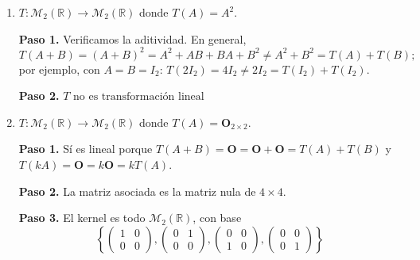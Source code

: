 \begin{prob}
\begin{enumerate}[$a)$]
\begin{myproof}
\textbf{Paso 4.} El rango de $A$ es $3$ (las filas son linealmente independientes) y los pivotes están en las columnas 1, 2 y 4, que forman una base para la imagen:
\[
\left\{
\begin{pmatrix}1\\0\\0\end{pmatrix},
\begin{pmatrix}1\\1\\0\end{pmatrix},
\begin{pmatrix}0\\1\\1\end{pmatrix}
\right\}
\]
$\boxed{\operatorname{rang}(T)=3,\ \operatorname{nul}(T)=2}$
\end{myproof}

\item $T:\mathcal{M}_{2}\left(\mathbb{R}\right) \rightarrow \mathcal{M}_{2}\left(\mathbb{R}\right)$ donde $
T(A)= A^{2}.$
\begin{myproof}
\textbf{Paso 1.} Verificamos la aditividad. En general,
\[
T(A+B) = (A+B)^2 = A^2 + AB + BA + B^2 \neq A^2 + B^2 = T(A) + T(B);
\]
por ejemplo, con $A = B = I_2$: $T(2I_2) = 4I_2 \neq 2I_2 = T(I_2) + T(I_2)$.

\textbf{Paso 2.} $\boxed{T \text{ no es transformación lineal}}$
\end{myproof}

\item $T:\mathcal{M}_{2}\left(\mathbb{R}\right) \rightarrow \mathcal{M}_{2}\left(\mathbb{R}\right)$ donde $T(A)=\mathbf{O}_{2\times 2}.$
\begin{myproof}
\textbf{Paso 1.} Sí es lineal porque $T(A+B) = \mathbf{O} = \mathbf{O} + \mathbf{O} = T(A) + T(B)$ y $T(kA) = \mathbf{O} = k\mathbf{O} = kT(A)$.

\textbf{Paso 2.} La matriz asociada es la matriz nula de $4\times 4$.

\textbf{Paso 3.} El kernel es todo $\mathcal{M}_2(\mathbb{R})$, con base
\[
\left\{
\begin{pmatrix}1&0\\0&0\end{pmatrix},
\begin{pmatrix}0&1\\0&0\end{pmatrix},
\begin{pmatrix}0&0\\1&0\end{pmatrix},
\begin{pmatrix}0&0\\0&1\end{pmatrix}
\right\}
\]


\end{myproof}
\end{enumerate}
\end{prob}
